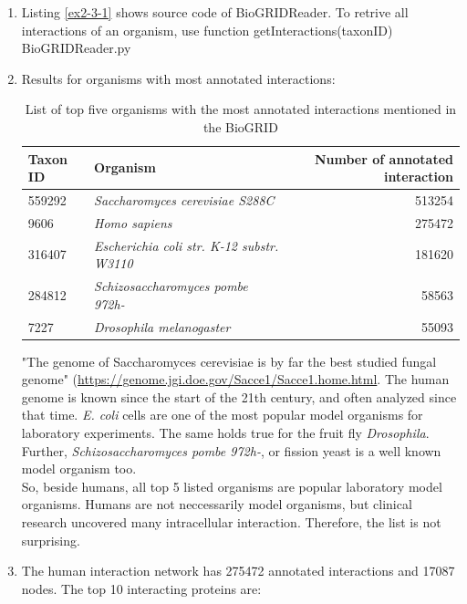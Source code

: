 \documentclass[10pt,a4paper]{article}
\begin{document}
\begin{enumerate}
\item Listing \ref{ex2-3-1} shows source code of BioGRIDReader. To retrive all interactions of an organism, use function getInteractions(taxonID)
 {BioGRIDReader.py}
\newpage
\item Results for organisms with most annotated interactions:
	\begin{table}[!h]
		\caption{List of top five organisms with the most annotated interactions mentioned in the BioGRID}
		\begin{tabular}{|l|l|r|}
			\hline
			Taxon ID & Organism & Number of annotated interaction\\
			\hline\hline
			559292 & \textit{Saccharomyces cerevisiae S288C} & 513254\\
			\hline
			9606 & \textit{Homo sapiens} & 275472\\
			\hline
			316407 & \textit{Escherichia coli str. K-12 substr. W3110} & 181620\\
			\hline
			284812 & \textit{Schizosaccharomyces pombe 972h-} & 58563\\
			\hline
			7227 & \textit{Drosophila melanogaster} & 55093\\
			\hline
		\end{tabular}
		"The genome of Saccharomyces cerevisiae is by far the best studied fungal genome" (\url{https://genome.jgi.doe.gov/Sacce1/Sacce1.home.html}. The human genome is known since the start of the 21th century, and often analyzed since that time. \textit{E. coli} cells are one of the most popular model organisms for laboratory experiments. The same holds true for the fruit fly \textit{Drosophila}. Further, \textit{Schizosaccharomyces pombe 972h-}, or fission yeast is a well known model organism too.\\
		So, beside humans, all top 5 listed organisms are popular laboratory model organisms. Humans are not neccessarily model organisms, but clinical research uncovered many intracellular interaction. Therefore, the list is not surprising.
	\end{table}
\item The human interaction network has 275472 annotated interactions and 17087 nodes.
The top 10 interacting proteins are:


\end{enumerate}
\end{document}
